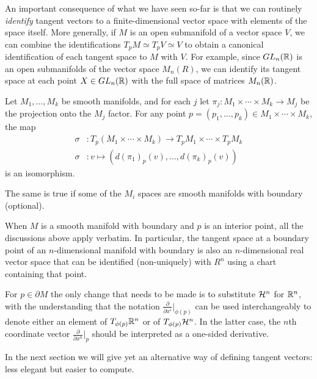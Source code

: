 An important consequence of what we have seen so-far is that we can routinely \emph{identify} tangent vectors to a finite-dimensional vector space with elements of the space itself.
More generally, if $M$ is an open submanifold of a vector space $V$, we can combine the identifications $T_p M \simeq T_p V \simeq V$ to obtain a canonical identification of each tangent space to $M$ with $V$.
For example, since $GL_n(\mathbb{R})$ is an open submanifolds of the vector space $M_n(R)$, we can identify its tangent space at each point $X\in GL_n(\mathbb{R})$ with the full space of matrices $M_n(\mathbb{R})$.

\begin{exercise}
  Let $M_1, \ldots, M_k$ be smooth manifolds, and for each $j$ let $\pi_j:M_1\times\cdots\times M_k \to M_j$ be the projection onto the $M_j$ factor.
  For any point $p=(p_1,\ldots,p_k)\in M_1\times\cdots\times M_k$, the map
  \begin{align}
    \sigma &: T_p(M_1\times\cdots\times M_k) \to T_p M_1\times\cdots\times T_p M_k\\
    \sigma &: v \mapsto \left(d(\pi_1)_p(v), \ldots, d(\pi_k)_p(v)\right)
  \end{align}
  is an isomorphism.

  The same is true if some of the $M_i$ spaces are smooth manifolds with boundary (optional).
\end{exercise}

\begin{remark}
  When $M$ is a smooth manifold with boundary and $p$ is an interior point, all the discussions above apply verbatim. In particular, the tangent space at a boundary point of an $n$-dimensional manifold with boundary is also an $n$-dimensional real vector space that can be identified (non-uniquely) with $R^n$ using a chart containing that point.

  For $p\in\partial M$ the only change that needs to be made is to substitute $\mathcal{H}^n$ for $\mathbb{R}^n$, with the understanding that the notation $\frac{\partial}{\partial x^i}\big|_{\phi(p)}$ can be used interchangeably to denote either an element of $T_{\phi(p)}\mathbb{R}^n$ or of $T_{\phi(p)}\mathcal{H}^n$. In the latter case, the $n$th coordinate vector $\frac{\partial}{\partial x^n}\big|_{p}$ should be interpreted as a one-sided derivative.
\end{remark}

In the next section we will give yet an alternative way of defining tangent vectors: less elegant but easier to compute.


